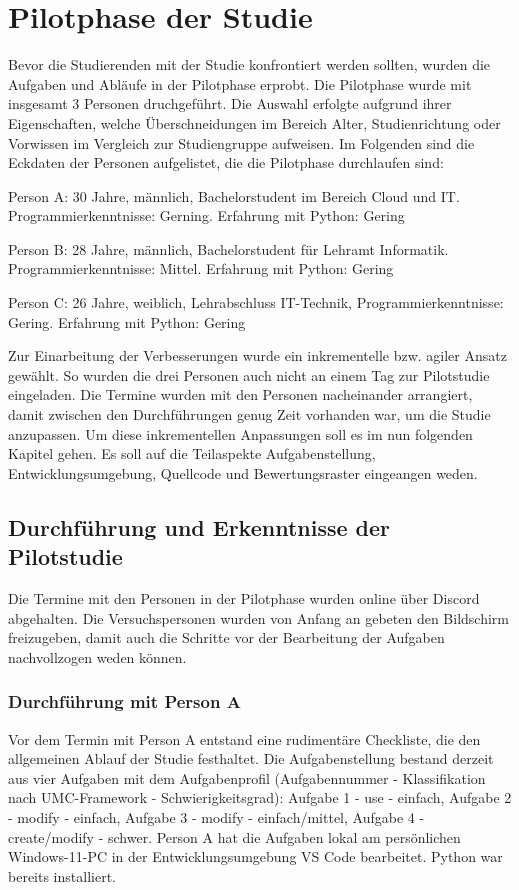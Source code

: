 \section{Pilotphase der Studie}\label{cha:pilot_auswertung}
Bevor die Studierenden mit der Studie konfrontiert werden sollten, wurden die Aufgaben und Abläufe in der Pilotphase erprobt. Die Pilotphase wurde mit insgesamt 3 Personen druchgeführt. Die Auswahl erfolgte aufgrund ihrer Eigenschaften, welche Überschneidungen im Bereich Alter, Studienrichtung oder Vorwissen im Vergleich zur Studiengruppe aufweisen. Im Folgenden sind die Eckdaten der Personen aufgelistet, die die Pilotphase durchlaufen sind:

Person A: 30 Jahre, männlich, Bachelorstudent im Bereich Cloud und IT. Programmierkenntnisse: Gerning. Erfahrung mit Python: Gering

Person B: 28 Jahre, männlich, Bachelorstudent für Lehramt Informatik. Programmierkenntnisse: Mittel. Erfahrung mit Python: Gering

Person C: 26 Jahre, weiblich, Lehrabschluss IT-Technik, Programmierkenntnisse: Gering. Erfahrung mit Python: Gering

Zur Einarbeitung der Verbesserungen wurde ein inkrementelle bzw. agiler Ansatz gewählt. So wurden die drei Personen auch nicht an einem Tag zur Pilotstudie eingeladen. Die Termine wurden mit den Personen nacheinander arrangiert, damit zwischen den Durchführungen genug Zeit vorhanden war, um die Studie anzupassen. Um diese inkrementellen Anpassungen soll es im nun folgenden Kapitel gehen. Es soll auf die Teilaspekte Aufgabenstellung, Entwicklungsumgebung, Quellcode und Bewertungsraster eingeangen weden.

\subsection{Durchführung und Erkenntnisse der Pilotstudie}\label{cha:pilotphase}
Die Termine mit den Personen in der Pilotphase wurden online über Discord abgehalten. Die Versuchspersonen wurden von Anfang an gebeten den Bildschirm freizugeben, damit auch die Schritte vor der Bearbeitung der Aufgaben nachvollzogen weden können.

\subsubsection{Durchführung mit Person A}
Vor dem Termin mit Person A entstand eine rudimentäre Checkliste, die den allgemeinen Ablauf der Studie festhaltet. Die Aufgabenstellung bestand derzeit aus vier Aufgaben mit dem Aufgabenprofil (Aufgabennummer - Klassifikation nach UMC-Framework - Schwierigkeitsgrad): Aufgabe 1 - use - einfach, Aufgabe 2 - modify - einfach, Aufgabe 3 - modify - einfach/mittel, Aufgabe 4 - create/modify - schwer. Person A hat die Aufgaben lokal am persönlichen Windows-11-PC in der Entwicklungsumgebung VS Code bearbeitet. Python war bereits installiert. 


